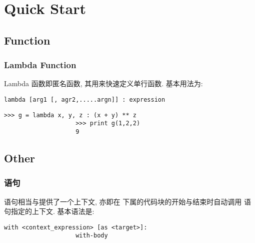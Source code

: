 \chapter{Quick Start}
\section{Function}
    \subsection{Lambda Function}
        \hspace*{2em} Lambda 函数即匿名函数, 其用来快速定义单行函数. 基本用法为:
            \begin{lstlisting}[gobble = 16]
                lambda [arg1 [, agr2,.....argn]] : expression
            \end{lstlisting}

            \begin{Example}[Lambda 函数]
                \begin{lstlisting}[gobble = 20]
                    >>> g = lambda x, y, z : (x + y) ** z
                    >>> print g(1,2,2)
                    9
                \end{lstlisting}
            \end{Example}

\section{Other}
    \subsection{ 语句}
        \hspace*{2em}  语句相当与提供了一个上下文, 亦即在  下属的代码块的开始与结束时自动调用  语句指定的上下文. 基本语法是:
            \begin{lstlisting}[gobble = 16]
                with <context_expression> [as <target>]:
                    with-body
            \end{lstlisting}

